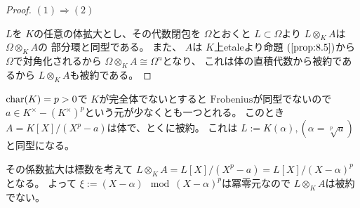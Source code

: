 \documentclass[../master_galois_theory]{subfiles}
\begin{document}
\begin{proof}
  $(1) \Rightarrow (2)$

  $L$を $K$の任意の体拡大とし、その代数閉包を $\Omega$とおくと
  $L \subset \Omega$より $L \otimes_K A$は $\Omega \otimes_K A$の
  部分環と同型である。
  また、 $A$は $K$上\rm{etale}より命題 $(\mathrm{\ref{prop:8.5}})$から
  $\Omega$で対角化されるから $\Omega \otimes_K A \cong \Omega^n$となり、
  これは体の直積代数から被約であるから $L \otimes_K A$も被約である。
\end{proof}

\begin{exam}
  $\mathrm{char}(K) = p > 0$で
  $K$が完全体でないとすると $\mathrm{Frobenius}$が同型でないので
  $a \in K^\times - (K^\times)^p$という元が少なくとも一つとれる。
  このとき $A = K[X]/(X^p - a)$は体で、とくに被約。
  これは $L := K(\alpha) , (\alpha = \sqrt[p]{a})$と同型になる。

  その係数拡大は標数を考えて $L \otimes_K A = L[X]/(X^p - a) = L[X]/(X - \alpha)^p$となる。
  よって $\xi := (X - \alpha) \mod (X - \alpha)^p$は冪零元なので
  $L \otimes_K A$は被約でない。
\end{exam}

\clearpage
\end{document}

